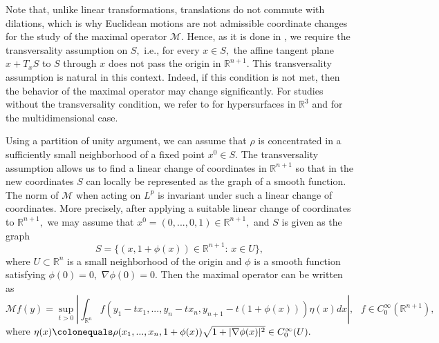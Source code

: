 \documentclass[a4paper, 11pt]{article}
\theoremstyle{plain}
\theoremstyle{definition}
\theoremstyle{lemma}
\theoremstyle{Remark}
\theoremstyle{proposition}
\theoremstyle{corollary}
\theoremstyle{example}
\theoremstyle{assumption}
\begin{document}
    Note that, unlike linear transformations, translations do not commute with
dilations, which is why Euclidean motions are not admissible coordinate changes for the
study of the maximal operator $\mathcal{M}$. Hence, as it is done in \cite{I.K.M,P1,P2},   we require the  transversality assumption on $S,$ i.e.,
for every $x\in S,$ the affine tangent plane $x+T_xS $ to $S$ through $x$ does not pass the origin in $\mathbb{R}^{n+1}.$ %
This  transversality assumption is natural in this context. Indeed, if this condition is not met, then the behavior of the maximal operator may change significantly.
For studies without the transversality condition, we refer to \cite{Zim} for hypersurfaces in $\mathbb{R}^3$ and \cite{Lee.Oh} for the multidimensional case.


  Using a partition of unity argument, we can assume that $\rho$ is concentrated in a sufficiently small neighborhood of a fixed point $x^0\in S.$  %
   The transversality assumption allows
us to find a linear change of coordinates in $\mathbb{R}^{n+1}$ so that in the new coordinates
$S$ can locally be represented as the graph of a smooth function. The norm of
$\mathcal{M}$ when acting on $L^p$ is invariant under such a linear change of coordinates.
More precisely, after applying a suitable linear change of coordinates to $\mathbb{R}^{n+1},$ we may
assume that $x^0 = (0,...,0,1)\in \mathbb{R}^{n+1},$  and   $S$ is given as the
graph
\begin{equation}\label{Smax}
S=\{(x, 1+\phi(x))\in \mathbb{R}^{n+1}:\,x\in U\},
\end{equation}
 where $U\subset \mathbb{R}^{n}$ is a small neighborhood  of the origin and  $\phi$ is a smooth function   satisfying $\phi(0)=0,$ $\nabla \phi (0)=0.$
Then the maximal  operator  can be written as
 \begin{equation*}
 \mathcal{M}f(y)= \sup_{t>0}\left| \int_{\mathbb{R}^n}f(y_1-tx_1,..., y_n-tx_n, y_{n+1}-t(1+\phi(x)))\eta(x)dx\right|, \,\,\,\,f\in C^{\infty}_0(\mathbb{R}^{n+1}),
 \end{equation*}
 where $\eta(x)\colonequals \rho(x_1,...,x_n,1+\phi(x))\sqrt{1+|\nabla \phi(x)|^2}\in C^{\infty}_0(U).$
\end{document}
